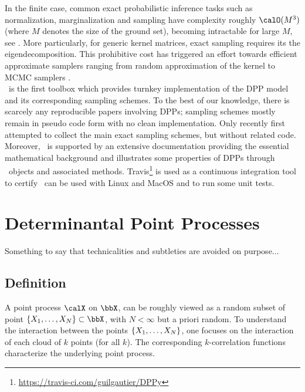 \documentclass[twoside,11pt]{article}
\begin{document}
  In the finite case, common exact probabilistic inference tasks such as normalization, marginalization and sampling have complexity roughly $\calO(M^3)$ (where $M$ denotes the size of the ground set), becoming intractable for large $M$, see \citet{Gil14}.
  More particularly, for generic kernel matrices, exact sampling requires its the eigendecomposition.
  This prohibitive cost has triggered an effort towards efficient approximate samplers ranging from random approximation of the kernel \citep{AfKuFo13} to MCMC samplers \citep{AnGhRe16, LiJeSr16c, GaBaVa17}.\\

  \DPPy\ is the first toolbox which provides turnkey implementation of the DPP model and its corresponding sampling schemes.
  To the best of our knowledge, there is scarcely any reproducible papers involving DPPs; sampling schemes mostly remain in pseudo code form with no clean implementation.
  Only recently \citet{TrBaAm18} first attempted to collect the main exact sampling schemes, but without related code.
  Moreover, \DPPy\ is supported by an extensive documentation providing the essential mathematical background and illustrates some properties of DPPs through \DPPy\ objects and associated methods.
  \setcounter{footnote}{5}
  Travis\footnote{\url{https://travis-ci.com/guilgautier/DPPy}} is used as a continuous integration tool to certify \DPPy\ can be used with Linux and MacOS and to run some unit tests.


\section{Determinantal Point Processes} %
\label{sec:determinantal_point_processes}

  Something to say that technicalities and subtleties are avoided on purpose...

  \subsection{Definition} %
  \label{sub:definition}
  
    A point process $\calX$ on $\bbX$, can be roughly viewed as a random subset of point $\lrcb{X_1, \dots, X_N} \subset \bbX$, with $N<\infty$ but a priori random.
    To understand the interaction between the points $\left\{ X_1, \dots, X_N \right\}$, one focuses on the interaction of each cloud of $k$ points (for all $k$). 
    The corresponding $k$-correlation functions characterize the underlying point process.
\end{document}
